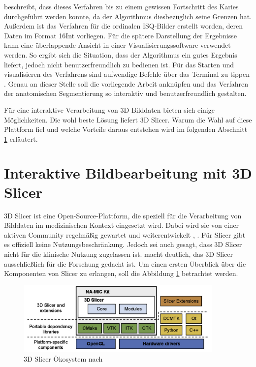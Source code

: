 \citet[S.~55]{hoffmann2020} beschreibt, dass dieses Verfahren bis zu einem
gewissen Fortschritt des Karies durchgeführt werden konnte, da der Algorithmus diesbezüglich
seine Grenzen hat. Außerdem ist das Verfahren für die ordinalen \ac{ISQ}-Bilder erstellt
worden, deren Daten im Format \ac{16Int} vorliegen. Für die spätere Darstellung
der Ergebnisse kann eine überlappende Ansicht in einer Visualisierungssoftware
verwendet werden. So ergibt sich die Situation, dass der Algorithmus ein gutes
Ergebnis liefert, jedoch nicht benutzerfreundlich zu bedienen ist. Für das
Starten und visualisieren des Verfahrens sind aufwendige Befehle über das
Terminal zu tippen \citep[vgl.][S.~53]{hoffmann2020}. Genau an dieser Stelle
soll die vorliegende Arbeit anknüpfen und das Verfahren der anatomischen
Segmentierung so interaktiv und benutzerfreundlich gestalten.

Für eine interaktive Verarbeitung von 3D Bilddaten bieten sich einige
Möglichkeiten. Die wohl beste Lösung liefert 3D Slicer. Warum die Wahl auf diese
Plattform fiel und welche Vorteile daraus entstehen wird im folgenden Abschnitt
\ref{sec:3d_slicer} erläutert.

\section{Interaktive Bildbearbeitung mit 3D Slicer}
\label{sec:3d_slicer} 3D Slicer ist eine Open-Source-Plattform, die speziell für
die Verarbeitung von Bilddaten im medizinischen Kontext eingesetzt wird. Dabei
wird sie von einer aktiven Community regelmäßig gewartet und weiterentwickelt
\citep[vgl.][]{slicer2024}, \citep[vgl.][S.~3]{fedorov2012slicer}. Für Slicer
gibt es offiziell keine Nutzungsbeschränkung. Jedoch sei auch gesagt, dass 3D
Slicer nicht für die klinische Nutzung zugelassen ist. \citet[S.~7]{fedorov2012slicer}
macht deutlich, das 3D Slicer ausschließlich für die Forschung gedacht ist. Um
einen ersten Überblick über die Komponenten von Slicer zu erlangen, soll die Abbildung
\ref{fig:3d_slicer_oekosystem} betrachtet werden.

\begin{figure}[h]
	\centering
	\includegraphics[width=0.9\textwidth]{img/3d_slicer_overview.jpg}
	\caption{3D Slicer Ökosystem nach \citet[S.~23]{fedorov2012slicer}}
	\label{fig:3d_slicer_oekosystem}
\end{figure}

